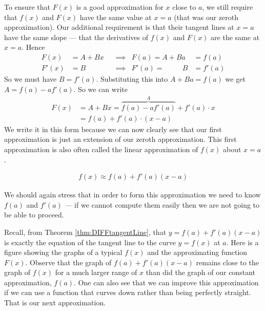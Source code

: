 To ensure that $F(x)$ is a good approximation for $x$ close to $a$, we still require that
$f(x)$ and $F(x)$ have the same value at $x=a$ (that was our zeroth approximation). Our
additional requirement is that their tangent lines at $x=a$ have the same slope --- that
the derivatives of $f(x)$ and $F(x)$ are the same at $x=a$. Hence
\begin{align*}
F(x)&=A+Bx  & &\implies & F(a)=A+Ba&=f(a)\\
F'(x)&=B    & &\implies & F'(a)=\phantom{A+a}B&=f'(a)
\end{align*}
So we must have $B=f'(a)$. Substituting this into $A+Ba=f(a)$ we get
$A=f(a)-af'(a)$. So
we can write
\begin{align*}
  F(x) &= A+Bx = \overbrace{f(a)- af'(a)}^A+ f'(a) \cdot x \\
  &= f(a) + f'(a) \cdot(x-a)
\end{align*}
We write it in this form because we can now clearly see that our first approximation is
just an extension of our zeroth approximation. This first approximation is also often
called the linear approximation of $f(x)$ about $x=a$.
\begin{impeqn}\label{eq:linApprox}
\begin{align*}
  f(x) \approx f(a)+f'(a)(x-a)
\end{align*}
\end{impeqn}
\noindent We should again stress that in order to form this approximation we need to know
$f(a)$ and $f'(a)$ --- if we cannot compute them easily then we are not going to be able
to proceed.



Recall, from Theorem \ref{thm:DIFFtangentLine}, that $y=f(a)+f'(a)(x-a)$
is exactly the equation of the tangent line to the curve $y=f(x)$ at $a$.
Here is a figure showing the graphs of a typical $f(x)$ and the approximating
function $F(x)$.
Observe that the graph of $f(a)+f'(a)(x-a)$ remains close to the
graph of $f(x)$ for a much larger range of $x$ than did the graph of our constant
approximation, $f(a)$. One can also see that we can improve this approximation if we can
use a function that curves down rather than being perfectly straight. That is our next
approximation.

